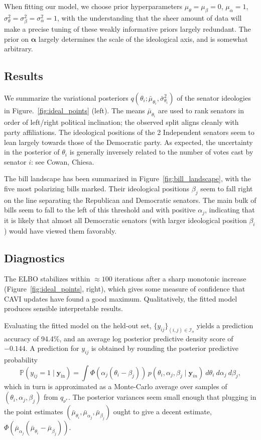 \documentclass[12pt]{article}
\renewcommand{\Pr}{\mathbb{P}}
\begin{document}
When fitting our model, we choose prior hyperparameters $\mu_{\theta} =
\mu_{\beta} = 0$, $\mu_{\alpha} = 1$, $\sigma_\theta^2 = \sigma_\beta^2 =
\sigma_\alpha^2 = 1$, with the understanding that the sheer amount of data will
make a precise tuning of these weakly informative priors largely redundant.
The prior on $\bm{\alpha}$ largely determines the scale of the ideological
axis, and is somewhat arbitrary.


\subsection*{Results}

We summarize the variational posteriors $q(\theta_i; \bar{\mu}_{\theta_i},
\bar{\sigma}_{\theta_i}^2)$ of the senator ideologies in
Figure.~\ref{fig:ideal_points} (left).
The means $\bar{\mu}_{\theta_i}$ are used to rank senators in order of
left/right political inclination; the observed split aligns cleanly with party
affiliations.
The ideological positions of the 2 Independent senators seem to lean largely
towards those of the Democratic party.
As expected, the uncertainty in the posterior of $\theta_i$ is generally
inversely related to the number of votes cast by senator $i$: see Cowan, Chiesa.

The bill landscape has been summarized in Figure~\ref{fig:bill_landscape}, with
the five most polarizing bills marked.
Their ideological positions $\beta_j$ seem to fall right on the line separating
the Republican and Democratic senators.
The main bulk of bills seem to fall to the left of this threshold and with
positive $\alpha_j$, indicating that it is likely that almost all Democratic
senators (with larger ideological position $\beta_i$) would have viewed them
favorably.


\subsection*{Diagnostics}

The ELBO stabilizes within $\approx100$ iterations after a sharp monotonic
increase (Figure~\ref{fig:ideal_points}, right), which gives some measure of
confidence that CAVI updates have found a good maximum.
Qualitatively, the fitted model produces sensible interpretable results.

Evaluating the fitted model on the held-out set, $\{y_{ij}\}_{(i, j) \in
\mathscr{I}_o}$ yields a prediction accuracy of 94.4\%, and an average log
posterior predictive density score of $-0.144$.
A prediction for $y_{ij}$ is obtained by rounding the posterior
predictive probability \[
    \Pr(y_{ij} = 1 \mid \bm{y}_\text{in})
        = \int \Phi(\alpha_j(\theta_i - \beta_j))\,p(\theta_i, \alpha_j, \beta_j \mid \bm{y}_{in})\:d\theta_i\:d\alpha_j\:d\beta_j,
\] which in turn is approximated as a Monte-Carlo average over samples of
$(\theta_i, \alpha_j, \beta_j)$ from $q_{\nu^*}$.
The posterior variances seem small enough that plugging in the point estimates
$(\bar\mu_{\theta_i}, \bar\mu_{\alpha_j}, \bar\mu_{\beta_j})$ ought to give a
decent estimate, $\Phi(\bar\mu_{\alpha_j}(\bar\mu_{\theta_i} -
\bar\mu_{\beta_j}))$.
\end{document}
